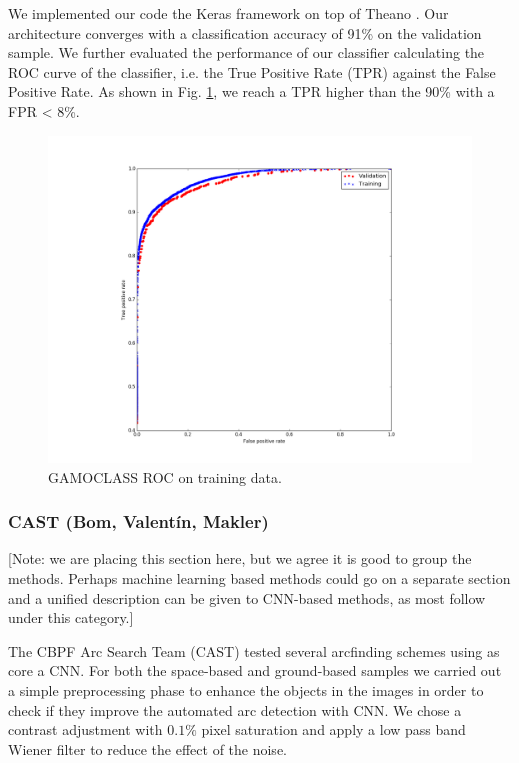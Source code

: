\documentclass[useAMS,usenatbib]{mnras}
\begin{document}
We implemented our code the Keras framework \citet{Chollet_2015} on top of Theano \citet{Bastien_2012}.
Our architecture converges with a classification accuracy of 91\% on the validation sample. We further evaluated the performance of our classifier calculating the ROC curve of the classifier, i.e. the True Positive Rate (TPR) against the False Positive Rate. As shown in Fig. \ref{Fig2_gamoclass}, we reach a TPR higher than the 90\% with a FPR < 8\%.

\begin{figure}
  \centering
      \includegraphics[width=1\columnwidth]{figures/Fig2_gamoclass.pdf} 
  \caption{GAMOCLASS ROC on training data.}
 \label{Fig2_gamoclass}
\end{figure}


\subsubsection{CAST (Bom, Valent\'in, Makler)}
[Note: we are placing this section here, but we agree it is good to group the methods. Perhaps machine learning based methods could go on a separate section and a unified description can be given to CNN-based methods, as most follow under this category.]

The CBPF Arc Search Team (CAST) tested several arcfinding schemes using as core a CNN. For both the space-based and ground-based samples we carried out a simple preprocessing phase to enhance the objects in the images in order to check if they improve the automated arc detection with CNN. We chose a contrast adjustment with $0.1\%$ pixel saturation and apply a low pass band Wiener filter \citep{wiener1964extrapolation} to reduce the effect of the noise. 
\end{document}
